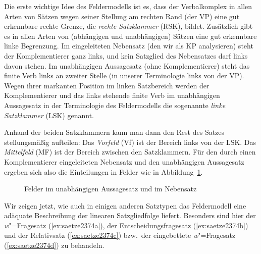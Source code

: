Die erste wichtige Idee des Feldermodells ist es, dass der Verbalkomplex in allen Arten von Sätzen wegen seiner Stellung am rechten Rand (der VP) eine gut erkennbare rechte Grenze, die \textit{rechte Satzklammer} (RSK), bildet.
Zusätzlich gibt es in allen Arten von (abhängigen und unabhängigen) Sätzen eine gut erkennbare linke Begrenzung.
Im eingeleiteten Nebensatz (den wir als KP analysieren) steht der Komplementierer ganz links, und kein Satzglied des Nebensatzes darf links davon stehen.
Im unabhängigen Aussagesatz (ohne Komplementierer) steht das finite Verb links an zweiter Stelle (in unserer Terminologie links von der VP).
Wegen ihrer markanten Position im linken Satzbereich werden der Komplementierer und das links stehende finite Verb im unabhängigen Aussagesatz in der Terminologie des Feldermodells die sogenannte \textit{linke Satzklammer} (LSK) genannt.

Anhand der beiden Satzklammern kann man dann den Rest des Satzes stellungsmäßig aufteilen:
Das \textit{Vorfeld} (Vf) ist der Bereich links von der LSK.
Das \textit{Mittelfeld} (MF) ist der Bereich zwischen den Satzklammern.
Für den durch einen Komplementierer eingeleiteten Nebensatz und den unabhängigen Aussagesatz ergeben sich also die Einteilungen in Felder wie in Abbildung~\ref{fig:felder1}.

\begin{figure}
  \caption{Felder im unabhängigen Aussagesatz und im Nebensatz}
  \label{fig:felder1}
\end{figure}


Wir zeigen jetzt, wie auch in einigen anderen Satztypen das Feldermodell eine adäquate Beschreibung der linearen Satzgliedfolge liefert.
Besonders sind hier der \textit{w}"=Fragesatz (\ref{ex:saetze2374a}), der Entscheidungsfragesatz (\ref{ex:saetze2374b}) und der Relativsatz (\ref{ex:saetze2374c}) bzw.\ der eingebettete \textit{w}"=Fragesatz (\ref{ex:saetze2374d}) zu behandeln.

